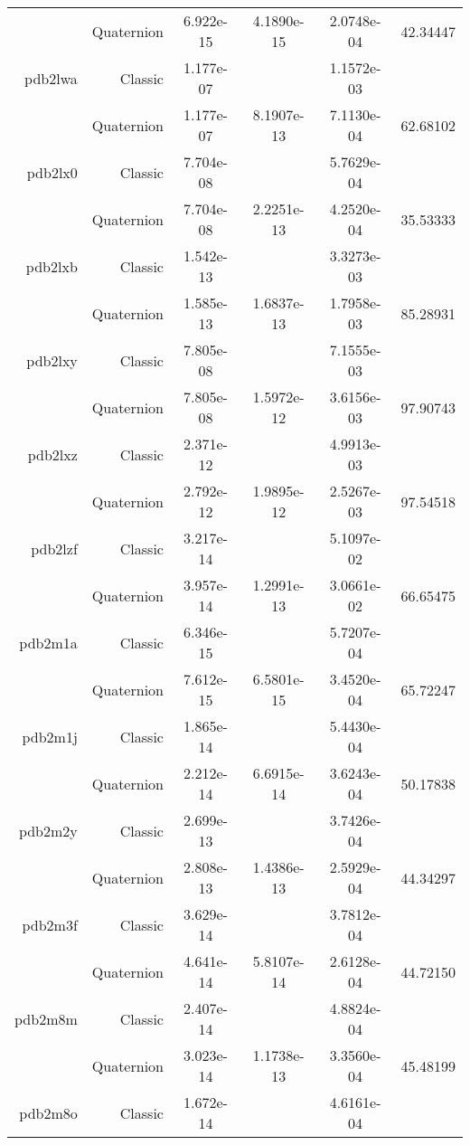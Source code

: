 \begin{xltabular}{\textwidth}{r|rS[table-format=1.3e+2]S[table-format=1.4e+2]S[table-format=1.4e+2]S[table-format=-1.5]}
& Quaternion & 6.922e-15 & 4.1890e-15 & 2.0748e-04 & 42.34447\\  \addlinespace
pdb2lwa & Classic & 1.177e-07 &  & 1.1572e-03 & \\
& Quaternion & 1.177e-07 & 8.1907e-13 & 7.1130e-04 & 62.68102\\  \addlinespace
pdb2lx0 & Classic & 7.704e-08 &  & 5.7629e-04 & \\
& Quaternion & 7.704e-08 & 2.2251e-13 & 4.2520e-04 & 35.53333\\  \addlinespace
pdb2lxb & Classic & 1.542e-13 &  & 3.3273e-03 & \\
& Quaternion & 1.585e-13 & 1.6837e-13 & 1.7958e-03 & 85.28931\\  \addlinespace
pdb2lxy & Classic & 7.805e-08 &  & 7.1555e-03 & \\
& Quaternion & 7.805e-08 & 1.5972e-12 & 3.6156e-03 & 97.90743\\  \addlinespace
pdb2lxz & Classic & 2.371e-12 &  & 4.9913e-03 & \\
& Quaternion & 2.792e-12 & 1.9895e-12 & 2.5267e-03 & 97.54518\\  \addlinespace
pdb2lzf & Classic & 3.217e-14 &  & 5.1097e-02 & \\
& Quaternion & 3.957e-14 & 1.2991e-13 & 3.0661e-02 & 66.65475\\  \addlinespace
pdb2m1a & Classic & 6.346e-15 &  & 5.7207e-04 & \\
& Quaternion & 7.612e-15 & 6.5801e-15 & 3.4520e-04 & 65.72247\\  \addlinespace
pdb2m1j & Classic & 1.865e-14 &  & 5.4430e-04 & \\
& Quaternion & 2.212e-14 & 6.6915e-14 & 3.6243e-04 & 50.17838\\  \addlinespace
pdb2m2y & Classic & 2.699e-13 &  & 3.7426e-04 & \\
& Quaternion & 2.808e-13 & 1.4386e-13 & 2.5929e-04 & 44.34297\\  \addlinespace
pdb2m3f & Classic & 3.629e-14 &  & 3.7812e-04 & \\
& Quaternion & 4.641e-14 & 5.8107e-14 & 2.6128e-04 & 44.72150\\  \addlinespace
pdb2m8m & Classic & 2.407e-14 &  & 4.8824e-04 & \\
& Quaternion & 3.023e-14 & 1.1738e-13 & 3.3560e-04 & 45.48199\\  \addlinespace
pdb2m8o & Classic & 1.672e-14 &  & 4.6161e-04 & \\

\end{xltabular}

